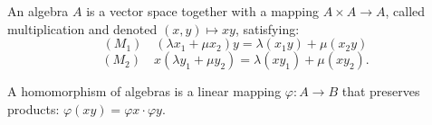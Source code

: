 An algebra $A$ is a vector space together with a mapping $A \times A \to A$, called multiplication and denoted $(x, y) \mapsto xy$, satisfying:
$$(M_1) \quad (\lambda x_1 + \mu x_2)y = \lambda(x_1 y) + \mu(x_2 y)$$
$$(M_2) \quad x(\lambda y_1 + \mu y_2) = \lambda(x y_1) + \mu(x y_2).$$

A homomorphism of algebras is a linear mapping $\varphi: A \to B$ that preserves products: $\varphi(xy) = \varphi x \cdot \varphi y$.
